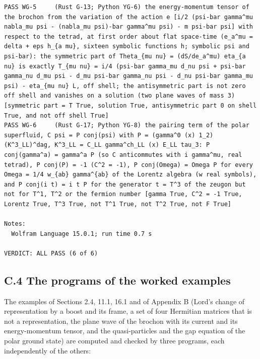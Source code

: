 \documentclass[
  10pt,
]{article}
\begin{document}
\begin{verbatim}
PASS WG-5     (Rust G-13; Python YG-6) the energy-momentum tensor of the brochon from the variation of the action e [i/2 (psi-bar gamma^mu nabla_mu psi - (nabla_mu psi)-bar gamma^mu psi) - m psi-bar psi] with respect to the tetrad, at first order about flat space-time (e_a^mu = delta + eps h_{a mu}, sixteen symbolic functions h; symbolic psi and psi-bar): the symmetric part of Theta_{mu nu} = (dS/de_a^mu) eta_{a nu} is exactly T_{mu nu} = i/4 (psi-bar gamma_mu d_nu psi + psi-bar gamma_nu d_mu psi - d_mu psi-bar gamma_nu psi - d_nu psi-bar gamma_mu psi) - eta_{mu nu} L, off shell; the antisymmetric part is not zero off shell and vanishes on a solution (two plane waves of mass 3) [symmetric part = T True, solution True, antisymmetric part 0 on shell True, and not off shell True]
PASS WG-6     (Rust G-17; Python YG-8) the pairing term of the polar superfluid, C psi = P conj(psi) with P = (gamma^0 (x) 1_2)(K^3_LL)^dag, K^3_LL = C_LL gamma^ch_LL (x) E_LL tau_3: P conj(gamma^a) = gamma^a P (so C anticommutes with i gamma^mu, real tetrad), P conj(P) = -1 (C^2 = -1), P conj(Omega) = Omega P for every Omega = 1/4 w_{ab} gamma^{ab} of the Lorentz algebra (w real symbols), and P conj(i t) = i t P for the generator t = T^3 of the zeugon but not for T^1, T^2 or the fermion number [gamma True, C^2 = -1 True, Lorentz True, T^3 True, not T^1 True, not T^2 True, not F True]

Notes:
  Wolfram Language 15.0.1; run time 0.7 s

VERDICT: ALL PASS (6 of 6)
\end{verbatim}

\hypertarget{c.4-the-programs-of-the-worked-examples}{%
\subsection{C.4 The programs of the worked
examples}\label{c.4-the-programs-of-the-worked-examples}}

The examples of Sections 2.4, 11.1, 16.1 and of Appendix B (Lord's
change of representation by a boost and its frame, a set of four
Hermitian matrices that is not a representation, the plane wave of the
brochon with its current and its energy-momentum tensor, and the
quasi-particles and the gap equation of the polar ground state) are
computed and checked by three programs, each independently of the
others:
\end{document}

